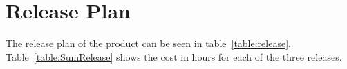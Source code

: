 \documentclass[10pt,a4paper]{article}
\begin{document}

\section{Release Plan}
The release plan of the product can be seen in table~\ref{table:release}. Table~\ref{table:SumRelease} shows the cost in hours for each of the three releases.
\end{document}

